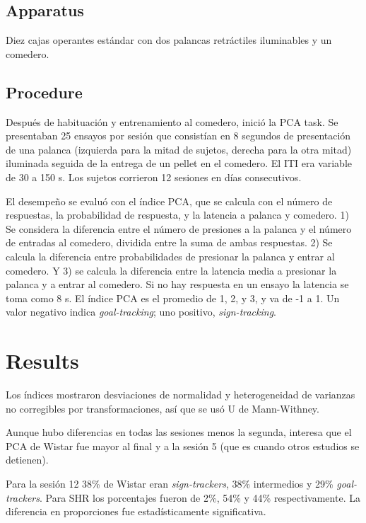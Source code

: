 \documentclass[a4paper,12pt]{article}
\begin{document}
\subsection{Apparatus}

Diez cajas operantes estándar con dos palancas retráctiles iluminables y un comedero.


\subsection{Procedure}

Después de habituación y entrenamiento al comedero, inició la PCA task.
Se presentaban 25 ensayos por sesión que consistían en 8 segundos de presentación de una palanca (izquierda para la mitad de sujetos, derecha para la otra mitad) iluminada seguida de la entrega de un pellet en el comedero.
El ITI era variable de 30 a 150 s.
Los sujetos corrieron 12 sesiones en días consecutivos.

El desempeño se evaluó con el índice PCA, que se calcula con el número de respuestas, la probabilidad de respuesta, y la latencia a palanca y comedero.
1) Se considera la diferencia entre el número de presiones a la palanca y el número de entradas al comedero, dividida entre la suma de ambas respuestas.
2) Se calcula la diferencia entre probabilidades de presionar la palanca y entrar al comedero.
Y 3) se calcula la diferencia entre la latencia media a presionar la palanca y a entrar al comedero.
Si no hay respuesta en un ensayo la latencia se toma como 8 s.
El índice PCA es el promedio de 1, 2, y 3, y va de -1 a 1.
Un valor negativo indica {\itshape goal-tracking}; uno positivo, {\itshape sign-tracking}.

\section{Results}

Los índices mostraron desviaciones de normalidad y heterogeneidad de varianzas no corregibles por transformaciones, así que se usó U de Mann-Withney.

Aunque hubo diferencias en todas las sesiones menos la segunda, interesa que el PCA de Wistar fue mayor al final y a la sesión 5 (que es cuando otros estudios se detienen).

Para la sesión 12 38\% de Wistar eran {\itshape sign-trackers}, 38\% intermedios y 29\% {\itshape goal-trackers}.
Para SHR los porcentajes fueron de 2\%, 54\% y 44\% respectivamente.
La diferencia en proporciones fue estadísticamente significativa.
\end{document}
